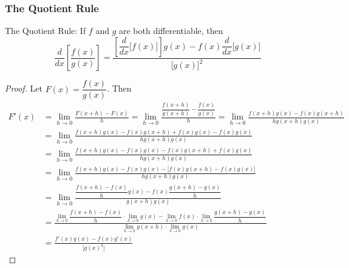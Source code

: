 \subsubsection*{The Quotient Rule}
The Quotient Rule: If \(f\) and \(g\) are both differentiable, then
\[\frac{d}{dx}\left[\frac{f(x)}{g(x)}\right]
=\frac{\left[\dfrac{d}{dx}\big[f(x)\big]\right]g(x)
-f(x)\dfrac{d}{dx}\big[g(x)\big]}{\big[g(x)\big]^2}\]
\begin{proof}
    Let \(F(x)=\dfrac{f(x)}{g(x)}\).
    Then
    \allowdisplaybreaks
    \begin{align*}
        F'(x) 
        &= \lim_{h\to 0}\frac{F(x+h)-F(x)}{h}
        =\lim_{h\to 0}\frac{\dfrac{f(x+h)}{g(x+h)}-\dfrac{f(x)}{g(x)}}{h}
        =\lim_{h\to 0}\frac{f(x+h)g(x)-f(x)g(x+h)}{hg(x+h)g(x)} \\
        &= \lim_{h\to 0}
        \frac{f(x+h)g(x)-f(x)g(x+h)+f(x)g(x)-f(x)g(x)}{hg(x+h)g(x)} \\
        &= \lim_{h\to 0}
        \frac{f(x+h)g(x)-f(x)g(x)-f(x)g(x+h)+f(x)g(x)}{hg(x+h)g(x)} \\
        &= \lim_{h\to 0}
        \frac{f(x+h)g(x)-f(x)g(x)
        -\big[f(x)g(x+h)-f(x)g(x)\big]}{hg(x+h)g(x)} \\
        &= \lim_{h\to 0}
        \frac{\dfrac{f(x+h)-f(x)}{h}g(x)
        -f(x)\dfrac{g(x+h)-g(x)}{h}}{g(x+h)g(x)} \\
        &= {\frac{\displaystyle{\lim_{h\to 0}}
        \dfrac{f(x+h)-f(x)}{h}\cdot\displaystyle{\lim_{h\to 0}}g(x)
        -\displaystyle{\lim_{h\to 0}}f(x)\cdot\displaystyle{\lim_{h\to 0}}
        \dfrac{g(x+h)-g(x)}{h}}{\displaystyle{\lim_{h\to 0}}g(x+h)
        \cdot\displaystyle{\lim_{h\to 0}}g(x)}} \\
        &= \frac{f'(x)g(x)-f(x)g'(x)}{\big[g(x)^2\big]}
    \end{align*}
\end{proof}

